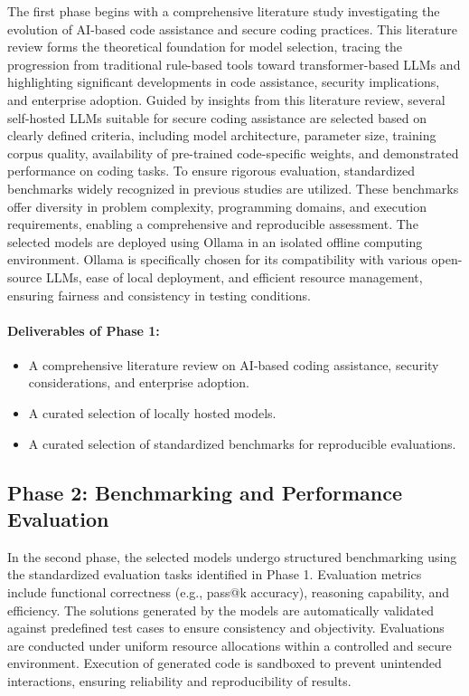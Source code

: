 The first phase begins with a comprehensive literature study investigating the evolution of AI-based code assistance and secure coding practices. This literature review forms the theoretical foundation for model selection, tracing the progression from traditional rule-based tools toward transformer-based LLMs and highlighting significant developments in code assistance, security implications, and enterprise adoption.
Guided by insights from this literature review, several self-hosted LLMs suitable for secure coding assistance are selected based on clearly defined criteria, including model architecture, parameter size, training corpus quality, availability of pre-trained code-specific weights, and demonstrated performance on coding tasks.
To ensure rigorous evaluation, standardized benchmarks widely recognized in previous studies are utilized. These benchmarks offer diversity in problem complexity, programming domains, and execution requirements, enabling a comprehensive and reproducible assessment.
The selected models are deployed using Ollama in an isolated offline computing environment. Ollama is specifically chosen for its compatibility with various open-source LLMs, ease of local deployment, and efficient resource management, ensuring fairness and consistency in testing conditions.

\paragraph{Deliverables of Phase 1:}
\begin{itemize}
    \item A comprehensive literature review on AI-based coding assistance, security considerations, and enterprise adoption.
    \item A curated selection of locally hosted models.
    \item A curated selection of standardized benchmarks for reproducible evaluations.
\end{itemize}

\subsection{Phase 2: Benchmarking and Performance Evaluation}

In the second phase, the selected models undergo structured benchmarking using the standardized evaluation tasks identified in Phase 1. Evaluation metrics include functional correctness (e.g., pass@k accuracy), reasoning capability, and efficiency. The solutions generated by the models are automatically validated against predefined test cases to ensure consistency and objectivity.
Evaluations are conducted under uniform resource allocations within a controlled and secure environment. Execution of generated code is sandboxed to prevent unintended interactions, ensuring reliability and reproducibility of results.

